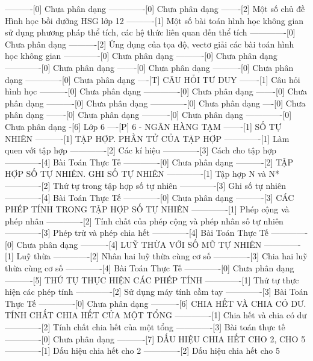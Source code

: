 ----------[0] Chưa phân dạng
-------------[0] Chưa phân dạng
-------[2] Một số chủ đề Hình học bồi dưỡng HSG lớp 12
----------[1] Một số bài toán hình học không gian sử dụng phương pháp thể tích, các hệ thức liên quan đến thể tích
-------------[0] Chưa phân dạng
----------[2] Ứng dụng của tọa độ, vectơ giải các bài toán hình học không gian
-------------[0] Chưa phân dạng
----------[0] Chưa phân dạng
-------------[0] Chưa phân dạng
-------[0] Chưa phân dạng
----------[0] Chưa phân dạng
-------------[0] Chưa phân dạng
----[T] CÂU HỎI TƯ DUY
-------[1] Câu hỏi hình học
----------[0] Chưa phân dạng
-------------[0] Chưa phân dạng
-------[0] Chưa phân dạng
----------[0] Chưa phân dạng
-------------[0] Chưa phân dạng
----[0] Chưa phân dạng
-------[0] Chưa phân dạng
----------[0] Chưa phân dạng
-------------[0] Chưa phân dạng
-[6] Lớp 6
----[P] 6 - NGÂN HÀNG TẠM
-------[1] SỐ TỰ NHIÊN
----------[1] TẬP HỢP. PHẦN TỬ CỦA TẬP HỢP
-------------[1] Làm quen với tập hợp
-------------[2] Các kí hiệu
-------------[3] Cách cho tập hợp
-------------[4] Bài Toán Thực Tế
-------------[0] Chưa phân dạng
----------[2] TẬP HỢP SỐ TỰ NHIÊN. GHI SỐ TỰ NHIÊN
-------------[1] Tập hợp N và N*
-------------[2] Thứ tự trong tập hợp số tự nhiên
-------------[3] Ghi số tự nhiên
-------------[4] Bài Toán Thực Tế
-------------[0] Chưa phân dạng
----------[3] CÁC PHÉP TÍNH TRONG TẬP HỢP SỐ TỰ NHIÊN
-------------[1] Phép cộng và phép nhân
-------------[2] Tính chất của phép cộng và phép nhân số tự nhiên
-------------[3] Phép trừ và phép chia hết
-------------[4] Bài Toán Thực Tế
-------------[0] Chưa phân dạng
----------[4] LUỸ THỪA VỚI SỐ MŨ TỰ NHIÊN
-------------[1] Luỹ thừa
-------------[2] Nhân hai luỹ thừa cùng cơ số
-------------[3] Chia hai luỹ thừa cùng cơ số
-------------[4] Bài Toán Thực Tế
-------------[0] Chưa phân dạng
----------[5] THỨ TỰ THỰC HIỆN CÁC PHÉP TÍNH
-------------[1] Thứ tự thực hiện các phép tính
-------------[2] Sử dụng máy tính cầm tay
-------------[3] Bài Toán Thực Tế
-------------[0] Chưa phân dạng
----------[6] CHIA HẾT VÀ CHIA CÓ DƯ. TÍNH CHẤT CHIA HẾT CỦA MỘT TỔNG
-------------[1] Chia hết và chia có dư
-------------[2] Tính chất chia hết của một tổng
-------------[3] Bài toán thực tế
-------------[0] Chưa phân dạng
----------[7] DẤU HIỆU CHIA HẾT CHO 2, CHO 5
-------------[1] Dấu hiệu chia hết cho 2
-------------[2] Dấu hiệu chia hết cho 5
